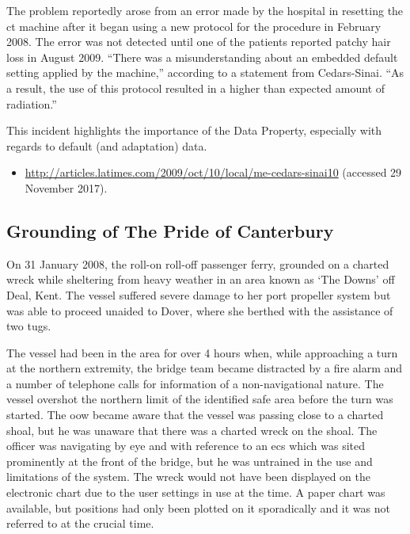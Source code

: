 The problem reportedly arose from an error made by the hospital in resetting the \gls{ct} machine after it began using a new protocol for the procedure in February 2008. The error was not detected until one of the patients reported patchy hair loss in August 2009. ``There was a misunderstanding about an embedded default setting applied by the machine,'' according to a statement from Cedars-Sinai. ``As a result, the use of this protocol resulted in a higher than expected amount of radiation.'' 

This incident highlights the importance of the  Data Property, especially with regards to default (and adaptation) data.

\begin{samepage}
\begin{itemize}
  \item \raggedright{\href{http://articles.latimes.com/2009/oct/10/local/me-cedars-sinai10}{http://articles.latimes.com/2009/oct/10/local/me-cedars-sinai10} (accessed 29 November 2017).}
\end{itemize}
\end{samepage}


\subsection{Grounding of The Pride of Canterbury} \label{bkm:incacc:canterbury}
On 31 January 2008, the roll-on roll-off passenger ferry,  grounded on a charted wreck while sheltering from heavy weather in an area known as `The Downs' off Deal, Kent. The vessel suffered severe damage to her port propeller system but was able to proceed unaided to Dover, where she berthed with the assistance of two tugs.

The vessel had been in the area for over 4 hours when, while approaching a turn at the northern extremity, the bridge team became distracted by a fire alarm and a number of telephone calls for information of a non-navigational nature. The vessel overshot the northern limit of the identified safe area before the turn was started. The \gls{oow} became aware that the vessel was passing close to a charted shoal, but he was unaware that there was a charted wreck on the shoal. The officer was navigating by eye and with reference to an \gls{ecs} which was sited prominently at the front of the bridge, but he was untrained in the use and limitations of the system. The wreck would not have been displayed on the electronic chart due to the user settings in use at the time. A paper chart was available, but positions had only been plotted on it sporadically and it was not referred to at the crucial time.

